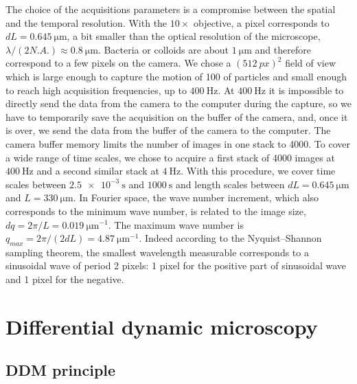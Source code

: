\documentclass[%
 aip,
 jmp,%
 amsmath,amssymb,
reprint,%
]{revtex4-1}
\begin{document}
The choice of the acquisitions parameters is a compromise between the spatial and the temporal resolution. With the $10\times$ objective, a pixel corresponds to $dL=\SI{0.645}{\micro\meter}$, a bit smaller than the optical resolution of the microscope, $\lambda/(2N.A.)\approx\SI{0.8}{\micro\meter} $. Bacteria or colloids are about $\SI{1}{\micro\meter}$ and therefore correspond to a few pixels on the camera. We chose a $(\SI{512}{px})^2$ field of view which is large enough to capture the motion of 100 of particles and small enough to reach high acquisition frequencies, up to $\SI{400}{\hertz}$. At $\SI{400}{\hertz}$ it is impossible to directly send the data from the camera to the computer during the capture, so we have to temporarily save the acquisition on the buffer of the camera, and, once it is over, we send the data from the buffer of the camera to the computer. The camera buffer memory limits the number of images in one stack to 4000. To cover a wide range of time scales, we chose to acquire a first stack of 4000 images at $\SI{400}{\hertz}$ and a second similar stack at $\SI{4}{\hertz}$. With this procedure, we cover time scales between $\SI{2.5e-3}{\second}$ and $\SI{1000}{\second}$ and length scales between $dL=\SI{0.645}{\micro\meter}$ and $L=\SI{330}{\micro\meter}$. In Fourier space, the wave number increment, which also corresponds to the minimum wave number, is related to the image size, $dq=2\pi/L=\SI{0.019}{\micro\meter^{-1}}$. The maximum wave number is $q_{max}=2\pi/(2dL)=\SI{4.87}{\micro\meter^{-1}}$. Indeed according to the Nyquist–Shannon sampling theorem, the smallest wavelength measurable corresponds to a sinusoidal wave of period 2 pixels: 1 pixel for the positive part of sinusoidal wave and 1 pixel for the negative.

\section{Differential dynamic microscopy}
\label{sec:ddm}
\subsection{DDM principle}
\end{document}
